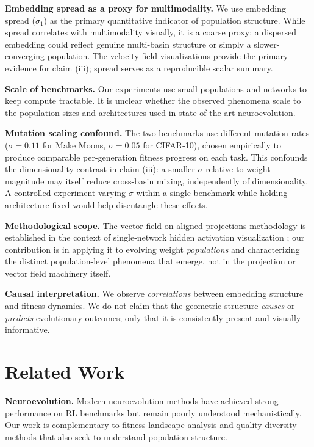 \documentclass{article}
\begin{document}
\textbf{Embedding spread as a proxy for multimodality.} We use
embedding spread ($\sigma_1$) as the primary quantitative indicator
of population structure. While spread correlates with multimodality
visually, it is a coarse proxy: a dispersed embedding could reflect
genuine multi-basin structure or simply a slower-converging population.
The velocity field visualizations provide the primary evidence for
claim (iii); spread serves as a reproducible scalar summary.

\textbf{Scale of benchmarks.} Our experiments use small populations
and networks to keep compute tractable. It is unclear whether the
observed phenomena scale to the population sizes and architectures
used in state-of-the-art neuroevolution.

\textbf{Mutation scaling confound.} The two benchmarks use different
mutation rates ($\sigma = 0.11$ for Make Moons, $\sigma = 0.05$ for
CIFAR-10), chosen empirically to produce comparable per-generation
fitness progress on each task. This confounds the dimensionality
contrast in claim (iii): a smaller $\sigma$ relative to weight
magnitude may itself reduce cross-basin mixing, independently of
dimensionality. A controlled experiment varying $\sigma$ within a
single benchmark while holding architecture fixed would help
disentangle these effects.

\textbf{Methodological scope.} The vector-field-on-aligned-projections
methodology is established in the context of single-network hidden
activation visualization \cite{cantareira2020exploring}; our
contribution is in applying it to evolving weight \emph{populations}
and characterizing the distinct population-level phenomena that emerge,
not in the projection or vector field machinery itself.

\textbf{Causal interpretation.} We observe \emph{correlations}
between embedding structure and fitness dynamics. We do not claim that
the geometric structure \emph{causes} or \emph{predicts} evolutionary
outcomes; only that it is consistently present and visually
informative.


\section{Related Work}

\textbf{Neuroevolution.} Modern neuroevolution methods
\cite{such2017deep,salimans2017evolution,real2017large} have achieved
strong performance on RL benchmarks but remain poorly understood
mechanistically. Our work is complementary to fitness landscape
analysis \cite{jones1995fitness} and quality-diversity methods
\cite{mouret2015illuminating} that also seek to understand population
structure.
\end{document}
